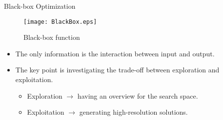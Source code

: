 \begin{frame}{Black-box Optimization}

  \begin{figure}[h]
    \texttt{[image: BlackBox.eps]}
    \caption{Black-box function}  
  \end{figure}
  \begin{itemize}
    \item The only information is the interaction between input and
    output.  
  \item The key point is investigating the trade-off between
    \alert{exploration}
    and \alert{exploitation}.
    \begin{itemize}
      \item Exploration $\rightarrow$ having an overview for the search
        space.
  \item Exploitation $\rightarrow$ generating high-resolution
    solutions. 
    \end{itemize}
  \end{itemize}

\end{frame}
